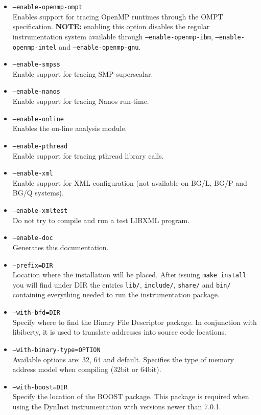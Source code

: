 \begin{itemize}
    \item {\tt --enable-openmp-ompt} \\
    Enables support for tracing OpenMP runtimes through the OMPT specification. \textbf{NOTE:} enabling this option disables the regular instrumentation system available through \texttt{--enable-openmp-ibm}, \texttt{--enable-openmp-intel} and \texttt{--enable-openmp-gnu}.
	\item {\tt --enable-smpss} \\
	Enable support for tracing SMP-superscalar.
	\item {\tt --enable-nanos} \\
	Enable support for tracing Nanos run-time.
        \item {\tt --enable-online} \\
        Enables the on-line analysis module.
	\item {\tt --enable-pthread} \\
	Enable support for tracing pthread library calls.
	\item {\tt --enable-xml} \\
	Enable support for XML configuration (not available on BG/L, BG/P and BG/Q systems).
	\item {\tt --enable-xmltest} \\
	Do not try to compile and run a test LIBXML program.
	\item {\tt --enable-doc} \\
	Generates this documentation.
	\item {\tt --prefix=DIR} \\
	Location where the installation will be placed. After issuing {\tt make install} you will find under DIR the entries {\tt lib/}, {\tt include/}, {\tt share/} and {\tt bin/} containing everything needed to run the instrumentation package.
	\item {\tt --with-bfd=DIR} \\
	Specify where to find the Binary File Descriptor package. In conjunction with libiberty, it is used to translate addresses into source code locations.
	\item {\tt --with-binary-type=OPTION} \\
	Available options are: 32, 64 and default. Specifies the type of memory address model when compiling (32bit or 64bit).
	\item {\tt --with-boost=DIR} \\
	Specify the location of the BOOST package. This package is required when using the DynInst instrumentation with versions newer than 7.0.1.

\end{itemize}
